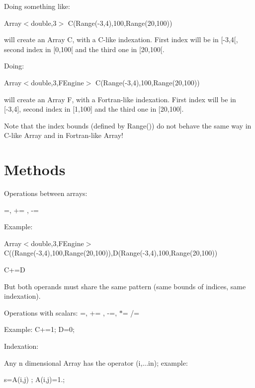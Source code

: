 \begin{DoxyItemize}
\item Doing something like\+:

Array$<$double,3$>$ C(Range(-\/3,4),100,Range(20,100))

will create an Array C, with a C-\/like indexation. First index will be in \mbox{[}-\/3,4\mbox{[}, second index in \mbox{[}0,100\mbox{[} and the third one in \mbox{[}20,100\mbox{[}.
\item Doing\+:

Array$<$double,3,\+F\+Engine$>$ C(Range(-\/3,4),100,Range(20,100))

will create an Array F, with a Fortran-\/like indexation. First index will be in \mbox{[}-\/3,4\mbox{]}, second index in \mbox{[}1,100\mbox{]} and the third one in \mbox{[}20,100\mbox{]}.
\begin{DoxyItemize}
\item Note that the index bounds (defined by Range()) do not behave the same way in C-\/like Array and in Fortran-\/like Array!
\end{DoxyItemize}
\end{DoxyItemize}\hypertarget{index_Methods}{}\section{Methods}\label{index_Methods}

\begin{DoxyItemize}
\item Operations between arrays\+:

=, += , -\/=

Example\+:

Array$<$double,3,\+F\+Engine$>$ C((Range(-\/3,4),100,Range(20,100)),D(Range(-\/3,4),100,Range(20,100))

C+=D

But both operands must share the same pattern (same bounds of indices, same indexation).
\item Operations with scalars\+: =, += , -\/=, $\ast$= /=
\end{DoxyItemize}

Example\+: C+=1; D=0;


\begin{DoxyItemize}
\item Indexation\+:
\end{DoxyItemize}

Any n dimensional Array has the operator (i,...in); example\+:

s=A(i,j) ; A(i,j)=1.;


